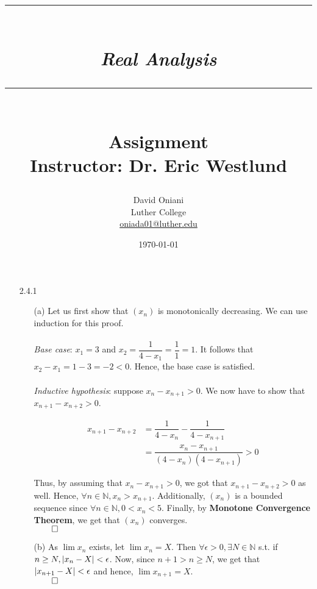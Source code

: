 \documentclass[11pt]{article}
\author{David Oniani\\
        Luther College\\
        \href{mailto:oniada01@luther.edu}{oniada01@luther.edu}}
\title{\rule{\paperwidth - 150pt}{1pt}\textbf{\\\textit{Real Analysis}\\}\rule
{\paperwidth - 150pt}{1pt}\\\textbf{Assignment \textnumero3}\\{\normalsize
Instructor: Dr. Eric Westlund}}
\date{\today}
\DeclarePairedDelimiter\abs{\lvert}{\rvert}%
\newcommand{\nats}{\mathbb{N}}
\begin{document}
\maketitle

%
%
%

\begin{itemize}
    \item[2.4.1]
        \begin{itemize}
            \item[(a)]
                Let us first show that $(x_n)$ is monotonically decreasing. We
                can use induction for this proof.
                \\\\
                \textit{Base case}: $x_1 = 3$ and $x_2 = \dfrac{1}{4 - x_1} =
                \dfrac{1}{1} = 1$.  It follows that $x_2 - x_1 = 1 - 3 = -2 <
                0$. Hence, the base case is satisfied.
                \\\\
                \textit{Inductive hypothesis}: suppose $x_n - x_{n + 1} > 0$.
                We now have to show that $x_{n + 1} - x_{n + 2} > 0$.

                \begin{align*}
                    x_{n + 1} - x_{n + 2} & = \dfrac{1}{4 - x_n} -
                        \dfrac{1}{4 - x_{n + 1}}\\
                                          & = \dfrac{x_n -x_{n + 1}}{(4 -
                                              x_n)(4 - x_{n + 1})} > 0
                \end{align*}

                Thus, by assuming that $x_n - x_{n + 1} > 0$, we got that $x_{n
                + 1} - x_{n + 2} > 0$ as well. Hence, $\forall n \in \nats, x_n
                > x_{n + 1}$. Additionally, $(x_n)$ is a bounded sequence since
                $\forall n \in \nats, 0 < x_n < 5$. Finally, by
                \textbf{Monotone Convergence Theorem}, we get that $(x_n)$
                converges.\\
                $\qed$

            \item[(b)]
                As $\lim{x_n}$ exists, let $\lim{x_n} = X$. Then $\forall
                \epsilon > 0, \exists N \in \nats$ s.t. if $n \geq N, \abs{x_n
                - X} < \epsilon$. Now, since $n + 1 > n \geq N$, we get that
                $\abs{x_{n + 1} - X} < \epsilon$ and hence, $\lim{x_{n + 1}} =
                X$.\\
                $\qed$


\end{itemize}
\end{itemize}
\end{document}
